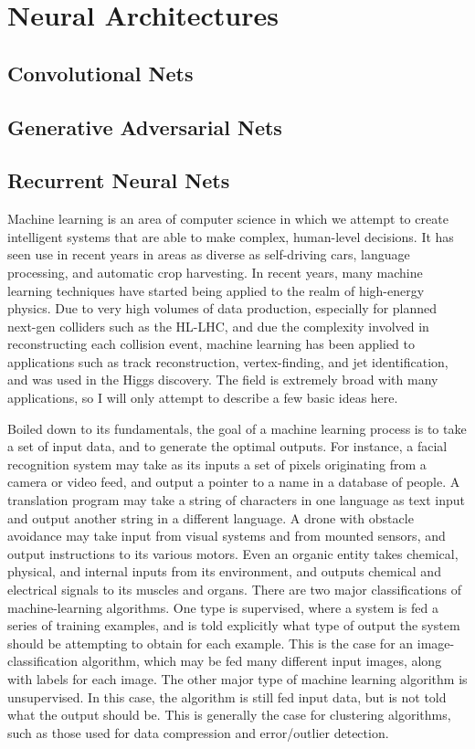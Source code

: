 \chapter{Neural Architectures}

\section{Convolutional Nets}

\section{Generative Adversarial Nets}

\section{Recurrent Neural Nets}\label{sec:RNN}


Machine learning is an area of computer science in which we attempt to create intelligent systems that are able to make complex, human-level decisions. It has seen use in recent years in areas as diverse as self-driving cars, language processing, and automatic crop harvesting. In recent years, many machine learning techniques have started being applied to the realm of high-energy physics. Due to very high volumes of data production, especially for planned next-gen colliders such as the HL-LHC, and due the complexity involved in reconstructing each collision event, machine learning has been applied to applications such as track reconstruction, vertex-finding, and jet identification, and was used in the Higgs discovery. The field is extremely broad with many applications, so I will only attempt to describe a few basic ideas here.

Boiled down to its fundamentals, the goal of a machine learning process is  to take a set of input data, and to generate the optimal outputs. For instance, a facial recognition system may take as its inputs a set of pixels originating from a camera or video feed, and output a pointer to a name in a database of people. A translation program may take a string of characters in one language as text input and output another string in a different language. A drone with obstacle avoidance may take input from visual systems and from mounted sensors, and output instructions to its various motors. Even an organic entity takes chemical, physical, and internal inputs from its environment, and outputs chemical and electrical signals to its muscles and organs. There are two major classifications of machine-learning algorithms. One type is supervised, where a system is fed a series of training examples, and is told explicitly what type of output the system should be attempting to obtain for each example. This is the case for an image-classification algorithm, which may be fed many different input images, along with labels for each image. The other major type of machine learning algorithm is unsupervised. In this case, the algorithm is still fed input data, but is not told what the output should be. This is generally the case for clustering algorithms, such as those used for data compression and error/outlier detection.

